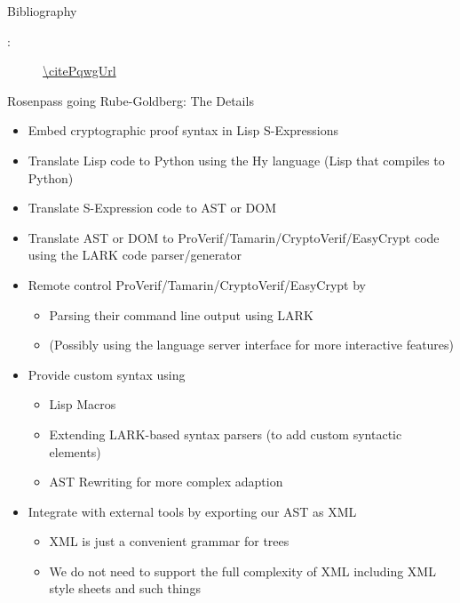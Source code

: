 

\begin{frame}{Bibliography}
  \begin{description}
    \item[\citePqwg:] \url{\citePqwgUrl}
  \end{description}
\end{frame}

\begin{frame}{Rosenpass going Rube-Goldberg: The Details}
\hypertarget{rosenpass-going-rube-goldberg-details}{}

\small
\begin{itemize}
\item
  Embed cryptographic proof syntax in Lisp S-Expressions
\item
  Translate Lisp code to Python using the Hy language (Lisp that
  compiles to Python)
\item
  Translate S-Expression code to AST or DOM
\item
  Translate AST or DOM to ProVerif/Tamarin/CryptoVerif/EasyCrypt code using the
  LARK code parser/generator
\item
  Remote control ProVerif/Tamarin/CryptoVerif/EasyCrypt by

  \begin{itemize}
  \item
    Parsing their command line output using LARK
  \item
    (Possibly using the language server interface for more interactive
    features)
  \end{itemize}
\item
  Provide custom syntax using

  \begin{itemize}
  \item
    Lisp Macros
  \item
    Extending LARK-based syntax parsers (to add custom syntactic
    elements)
  \item
    AST Rewriting for more complex adaption
  \end{itemize}
\item
  Integrate with external tools by exporting our AST as XML

  \begin{itemize}
  \item
    XML is just a convenient grammar for trees
  \item
    We do not need to support the full complexity of XML including XML
    style sheets and such things
  \end{itemize}
\end{itemize}
\end{frame}

